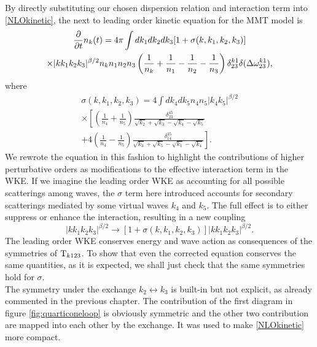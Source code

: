     By directly substituting our chosen dispersion relation and interaction term into \eqref{NLOkinetic}, the next to leading order kinetic equation for the MMT 
    model is 
    \begin{multline}
        \frac{\partial}{\partial t}n_k(t) = 4\pi \int dk_1dk_2dk_3[1 + \sigma(k,k_1,k_2,k_3)]\\
        \times |kk_1k_2k_3|^{\beta/2} n_kn_1n_2n_3 \left(\frac{1}{n_k} +\frac{1}{n_1}-
        \frac{1}{n_2}-\frac{1}{n_3}\right)\delta_{23}^{k1}\delta(\Delta{\omega}^{k1}_{23}), 
        \label{wke_nlo}
    \end{multline}
    where 
    \begin{multline}
        \sigma(k,k_1,k_2,k_3) =  4 \int dk_4dk_5n_4n_5|k_4k_5|^{\beta/2} \\
        \times \left[\left( \frac{1}{n_4}+\frac{1}{n_5} \right) 
        \frac{\delta_{23}^{45}}{\sqrt{k_2}+\sqrt{k_3}-\sqrt{k_4}-\sqrt{k_5}} \right.
        \\ + 4\left( \frac{1}{n_4}-\frac{1}{n_5} \right) 
        \left.\frac{\delta_{14}^{35}}{\sqrt{k_3}+\sqrt{k_5}-\sqrt{k_1}-\sqrt{k_4}}\right].
        \label{sigma}
    \end{multline}
    We rewrote the equation in this fashion to highlight the contributions of higher perturbative orders as modifications to the effective interaction term in the WKE.
    If we imagine the leading order WKE as accounting for all possible scatterings among waves, the $\sigma$ term here introduced accounts for secondary scatterings 
    mediated by some virtual waves $k_4$ and $k_5$. The full effect is to either suppress or enhance the interaction, resulting in a new coupling 
    \begin{equation*}
    |kk_1k_2k_3|^{\beta/2} \longrightarrow [1 + \sigma(k,k_1,k_2,k_3)]|kk_1k_2k_3|^{\beta/2} . 
    \end{equation*}
    The leading order WKE conserves energy and wave action as consequences of the symmetries of $\mathrm{T}_{k123}$. To show that even the corrected equation 
    conserves the same quantities, as it is expected, we shall just check that the same symmetries hold for $\sigma$.\\
    The symmetry under the exchange $k_2 \leftrightarrow k_3$ is built-in but not explicit, as already commented in the previous chapter. The contribution of the 
    first diagram in figure \ref{fig:quarticoneloop} is obviously symmetric and the other two contribution are mapped into each other by the exchange. It was used to make
    \eqref{NLOkinetic} more compact. \\
